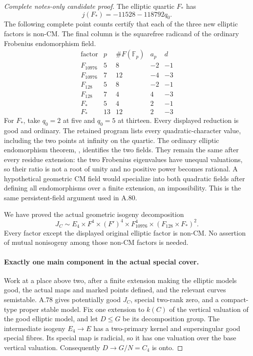 \begin{proof}[Complete notes-only candidate proof]
The elliptic quartic \(F_*\) has
\[
       j(F_*)=-11528-118792q_0.                        \tag{A.82.11}
\]
The following complete point counts certify that each of the three
new elliptic factors is non-CM. The final column is the squarefree
radicand of the ordinary Frobenius endomorphism field.
\[
 \begin{array}{c|r|r|r|r}
 \text{factor}&p&\#F(\mathbb F_p)&a_p&d\\ \hline
 F_{10976}&5&8&-2&-1\\
 F_{10976}&7&12&-4&-3\\
 F_{128}&5&8&-2&-1\\
 F_{128}&7&4&4&-3\\
 F_*&5&4&2&-1\\
 F_*&13&12&2&-3
 \end{array}                                         \tag{A.82.12}
\]
For \(F_*\), take \(q_0=2\) at five and \(q_0=5\) at
thirteen. Every displayed reduction is good and ordinary. The
retained program lists every quadratic-character value, including
the two points at infinity on the quartic. The ordinary elliptic
endomorphism theorem, \cite[V.3.1, printed p.145]{fghSilvermanAEC}, identifies the two fields.
They remain the same after every residue extension: the two
Frobenius eigenvalues have unequal valuations, so their ratio is
not a root of unity and no positive power becomes rational.
A hypothetical geometric CM field would specialize into both
quadratic fields after defining all endomorphisms over a finite
extension, an impossibility. This is the same persistent-field
argument used in A.80.

We have proved the actual geometric isogeny decomposition
\[
 J_C\sim E_4\times F^4\times(F')^4\times F_{10976}^4
                              \times(F_{128}\times F_*)^2.
                                                               \tag{A.82.13}
\]
Every factor except the displayed original elliptic factor is
non-CM. No assertion of mutual nonisogeny among those non-CM
factors is needed.

\paragraph{Exactly one main component in the actual special cover.}
Work at a place above two, after a finite extension making the
elliptic models good, the actual maps and marked points defined,
and the relevant curves semistable. A.78 gives potentially good
\(J_C\), special two-rank zero, and a compact-type proper stable
model. Fix one extension to \(k(C)\) of the vertical valuation of
the good elliptic model, and let \(D\le G\) be its decomposition
group. The intermediate isogeny \(E_4\to E\) has a two-primary
kernel and supersingular good special fibres. Its special map is
radicial, so it has one valuation over the base vertical valuation.
Consequently \(D\to G/N=C_4\) is onto.


\end{proof}
